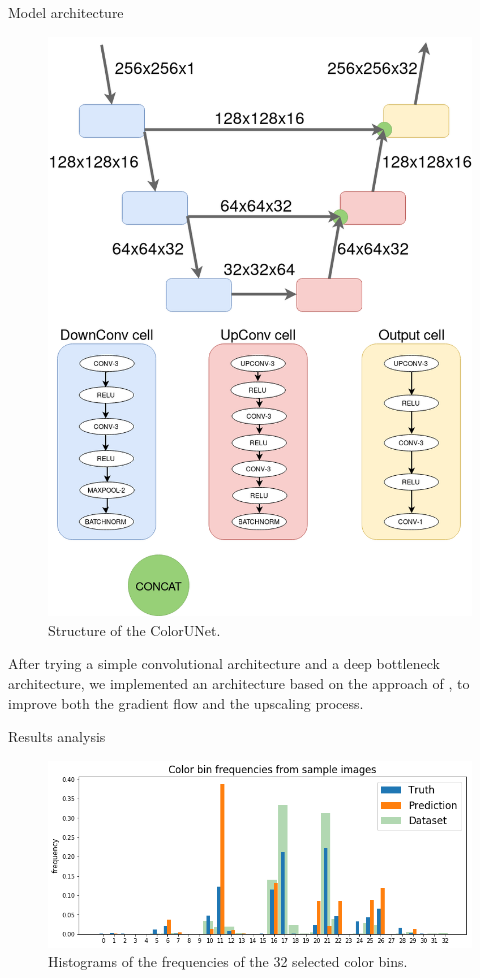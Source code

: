 \documentclass[final]{beamer}
\newlength{\onecolwid}
\begin{document}
\begin{frame}[t]
\begin{columns}[t]
\begin{column}{\onecolwid}
\begin{block}{Model architecture}
  \begin{figure}
  \begin{center}
  \includegraphics[width=.5\linewidth]{diagram}
  \caption{Structure of the ColorUNet.}
  \label{structure}
  \end{center}
  \end{figure}

After trying a simple convolutional architecture and a deep bottleneck architecture, we implemented an architecture based on the approach of \cite{ronneberger2015unet}, to improve both the gradient flow and the upscaling process.

\end{block}


\begin{block}{Results analysis}


\begin{figure}
\begin{center}
\includegraphics[width=\linewidth]{histogram_compact}
\caption{Histograms of the frequencies of the 32 selected color bins.}
\label{histogram}
\end{center}
\end{figure}




\end{block}
\end{column}
\end{columns}
\end{frame}
\end{document}
